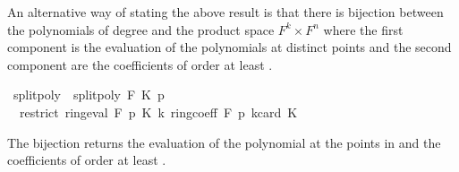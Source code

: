 \begin{isabellebody}
\begin{isamarkuptext}
An alternative way of stating the above result is that there is bijection between the polynomials
of degree  and the product space $F^k \times F^n$ where the first component is
the evaluation of the polynomials at  distinct points and the second component are the
coefficients of order at least .%
\end{isamarkuptext}\isamarkuptrue%
\isamarkupfalse%
\ split{\isacharunderscore}{\kern0pt}poly\ \ {\isachardoublequoteopen}split{\isacharunderscore}{\kern0pt}poly\ F\ K\ p\ {\isacharequal}{\kern0pt}\ \isanewline
\ \ {\isacharparenleft}{\kern0pt}restrict\ {\isacharparenleft}{\kern0pt}ring{\isachardot}{\kern0pt}eval\ F\ p{\isacharparenright}{\kern0pt}\ K{\isacharcomma}{\kern0pt}\ {\isasymlambda}k{\isachardot}{\kern0pt}\ ring{\isachardot}{\kern0pt}coeff\ F\ p\ {\isacharparenleft}{\kern0pt}k{\isacharplus}{\kern0pt}card\ K{\isacharparenright}{\kern0pt}{\isacharparenright}{\kern0pt}{\isachardoublequoteclose}%
\begin{isamarkuptext}%
The bijection  returns the evaluation of the polynomial
at the points in  and the coefficients of order at least .


\end{isamarkuptext}
\end{isabellebody}

